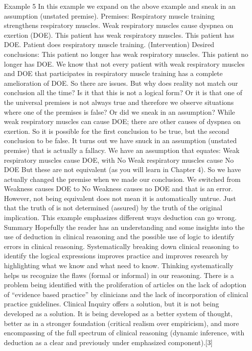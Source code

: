\documentclass[
]{book}
\begin{document}
Example 5
In this example we expand on the above example and sneak in an assumption (unstated premise).
Premises:
Respiratory muscle training strengthens respiratory muscles.
Weak respiratory muscles cause dyspnea on exertion (DOE).
This patient has weak respiratory muscles.
This patient has DOE.
Patient does respiratory muscle training. (Intervention)
Desired conclusions:
This patient no longer has weak respiratory muscles.
This patient no longer has DOE.
We know that not every patient with weak respiratory muscles and DOE that participates in respiratory muscle training has a complete amelioration of DOE. So there are issues. But why does reality not match our conclusion all the time? Is it that this is not a logical form? Or it is that one of the universal premises is not always true and therefore we observe situations where one of the premises is false? Or did we sneak in an assumption? While weak respiratory muscles can cause DOE; there are other causes of dyspnea on exertion. So it is possible for the first conclusion to be true, but the second conclusion to be false. It turns out we have snuck in an assumption (unstated premise) that is actually a fallacy. We have an assumption that equates:
Weak respiratory muscles cause DOE, with
No Weak respiratory muscles cause No DOE
But these are not equivalent (as you will learn in Chapter 4). So we have actually changed the premise when we made our conclusion. We switched from Weakness causes DOE to No Weakness causes no DOE and that is an error. However, not being equivalent does not mean it is automatically untrue. Just that the truth of is not determined (assured) by the truth of the original implication. This example emphasizes different ways deduction can go wrong.
Summary
Hopefully the reader has an understanding and some insights into the use of deduction in clinical reasoning and the possible use of logic to identify errors in clinical reasoning. Systematically breaking down clinical reasoning to identify the logical expressions improves practice and improves research by highlighting what we know and what need to know. Thinking systematically helps us recognize the flaws (formal or informal) in our reasoning. There is a problem being identified with the proliferation of articles on the lack of adoption of ``evidence based practice'' by clinicians and the lack of incorporation of clinical practice guidelines. Clinical Inquiry offers a solution, but it is not being developed as a solution. It is being developed as a better system of thought, better as in a stronger foundation (critical realism over empiricism), and more encompassing of the full spectrum of clinical reasoning (dynamic inference, with deduction as a clear and previously under emphasized component).{[}3{]}
\end{document}
